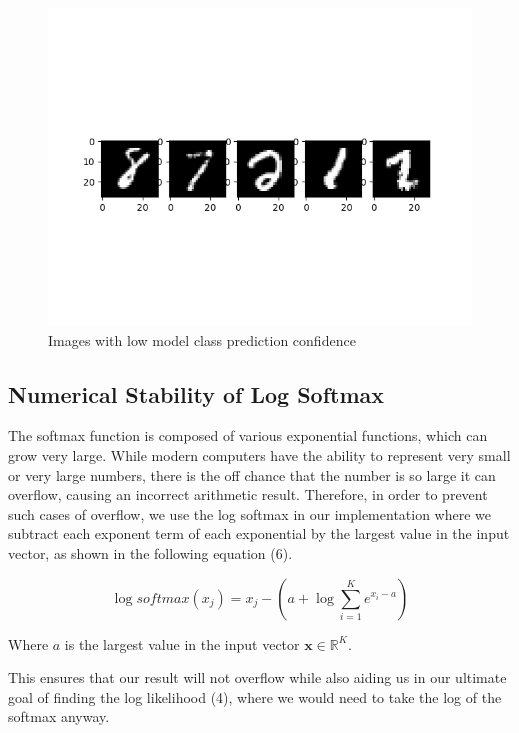 \documentclass[11pt,letterpaper,titlepage]{article}
\begin{document}
	\begin{figure}[H]
		\includegraphics[width=\linewidth]{Unconfident Inputs.png}
		\caption{Images with low model class prediction confidence}
		\label{fig: SGD Multi LR 0.0001}
	\end{figure}
	
	\subsection{Numerical Stability of Log Softmax}
	The softmax function is composed of various exponential functions, which can grow very large. While modern computers have the ability to represent very small or very large numbers, there is the off chance that the number is so large it can overflow, causing an incorrect arithmetic result. Therefore, in order to prevent such cases of overflow, we use the log softmax in our implementation where we subtract each exponent term of each exponential by the largest value in the input vector, as shown in the following equation (6). 
	
	\begin{equation}
	\log softmax(x_{j})= x_{j} - (a + \log \sum_{i=1}^{K}e^{x_{i}-a})
	\end{equation}
	
	Where $a$ is the largest value in the input vector $\mathbf{x} \in \mathbb{R}^{K}$.
	
	This ensures that our result will not overflow while also aiding us in our ultimate goal of finding the log likelihood (4), where we would need to take the log of the softmax anyway.
	
\end{document}
